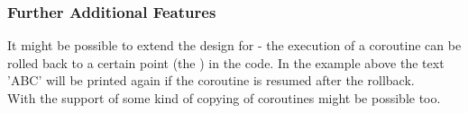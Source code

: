 \subsubsection*{Further Additional Features}
It might be possible to extend the design for \checkpointing - the execution of
a coroutine can be rolled back to a certain point (the \checkpoint) in the code.
In the example above the text 'ABC' will be printed again if the coroutine
is resumed after the rollback.\\
\newline
With the support of \checkpointing some kind of copying of coroutines might be
possible too.
